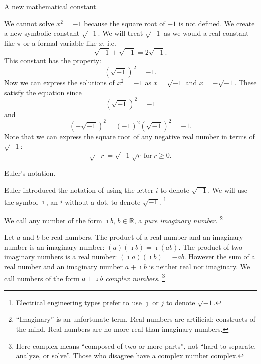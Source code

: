 \documentclass{slides}
\begin{document}
\begin{slide}
\begin{center}
\begin{large}
A new mathematical constant.
\end{large}
\end{center}
We cannot solve $x^2 = -1$ because the square root of $-1$ is not defined.  
We create a new symbolic constant $\sqrt{-1}$.  
We will treat $\sqrt{-1}$ as we would a real constant like $\pi$ or a 
formal variable like $x$, i.e. 
\[ 
\sqrt{-1} + \sqrt{-1} = 2 \sqrt{-1}.
\]
This constant has the property:
\[
\left( \sqrt{-1} \right)^2 = -1.
\]
Now we can express the solutions
of $x^2 = -1$ as $x = \sqrt{-1}$ and $x = - \sqrt{-1}$.  These satisfy
the equation since 
\[
\left( \sqrt{-1} \right)^2 = -1
\]
and 
\[
\left( - \sqrt{-1} \right)^2 = (-1)^2 \left( \sqrt{-1} \right)^2 = -1.
\]
Note that we can express the square root of any negative real number in 
terms of $\sqrt{-1}$: 
\[
\sqrt{-r} = \sqrt{-1} \sqrt{r}\ \mathrm{for}\ r \geq 0.  
\]
\end{slide}



\begin{slide}
\begin{center}
\begin{large}
Euler's notation.
\end{large}
\end{center}
Euler introduced the notation of using the letter $i$ to denote $\sqrt{-1}$.
We will use the symbol $\imath$, an $i$ without a dot, to denote 
$\sqrt{-1}$.%
\footnote{
  Electrical engineering types prefer to use $\jmath$ or $j$ to denote
  $\sqrt{-1}$.
  }

We call any number of the form $\imath b$, 
$b \in \mathbb{R}$, a \textit{pure imaginary number}.%
\footnote{
  ``Imaginary'' is an unfortunate term.  Real numbers are 
  artificial; constructs of the mind.  Real numbers are no more real than
  imaginary numbers.
  }

Let $a$ and $b$ be real numbers.  The product of a real number and an 
imaginary number is an imaginary number: $(a)(\imath b) = \imath (a b)$.
The product of two imaginary numbers is a real number: 
$(\imath a)(\imath b) = - a b$.  However the sum of a real number and an 
imaginary number $a + \imath b$ is neither real nor imaginary.
We call numbers of the form $a + \imath b$ \textit{complex numbers}.%
\footnote{
  Here complex means ``composed of two or more parts'', not
  ``hard to separate, analyze, or solve''.  Those who disagree have a 
  complex number complex.
  }
\end{slide}
\end{document}
